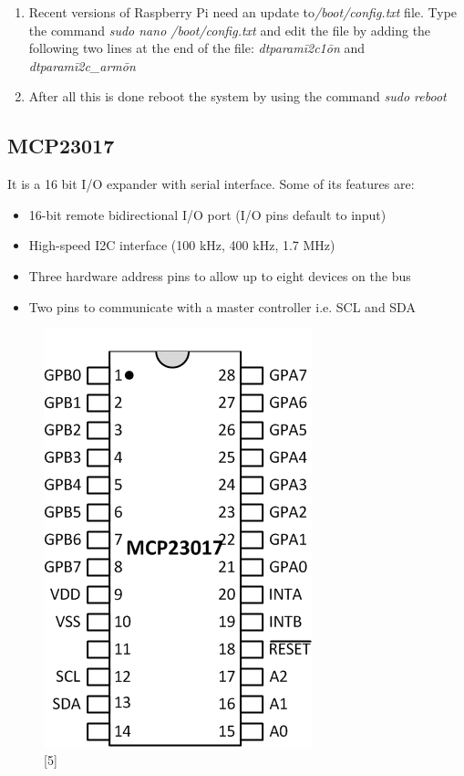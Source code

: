 \documentclass[11pt,a4paper]{article}
\begin{document}
\begin{enumerate}
		\item Recent versions of Raspberry Pi need an update to\textit{/boot/config.txt} file. Type the command \textit{sudo nano /boot/config.txt} and edit the file by adding the following two lines at the end of the file: \textit{dtparam\=i2c1\=on} and \textit{dtparam\=i2c\_arm\=on}
				
		\item After all this is done reboot the system by using the command \textit{sudo reboot}	
	
	\end{enumerate}
	
	\newpage
	\subsection{MCP23017}
	It is a 16 bit I/O expander with serial interface. Some of its features are:
	\begin{itemize}
		\item 16-bit remote bidirectional I/O port (I/O pins default to input)
		\item High-speed I2C interface (100 kHz, 400 kHz, 1.7 MHz)
		\item Three hardware address pins to allow up to eight devices on the bus
		\item Two pins to communicate with a master controller i.e. SCL and SDA
	\end{itemize}
	
	\begin{figure}[h!]
		\includegraphics[scale=0.7]{mcp23017.png}
		\centering
		\caption{[5]}
	\end{figure}
	
\end{document}
